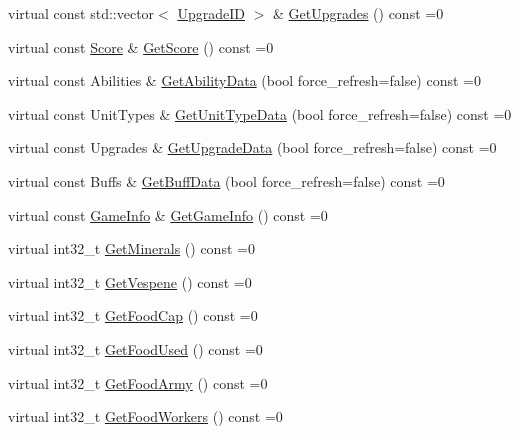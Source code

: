 \begin{DoxyCompactItemize}
\item 
virtual const std\+::vector$<$ \hyperlink{classsc2_1_1_s_c2_type}{Upgrade\+ID} $>$ \& \hyperlink{classsc2_1_1_observation_interface_a0a794661f0072921a75d4c5851cfb9e9}{Get\+Upgrades} () const =0
\item 
virtual const \hyperlink{structsc2_1_1_score}{Score} \& \hyperlink{classsc2_1_1_observation_interface_a3ced6a72078288c373ad04c72eb1fba7}{Get\+Score} () const =0
\item 
virtual const Abilities \& \hyperlink{classsc2_1_1_observation_interface_a99e1d892c350e4ae10c615bf3185eb85}{Get\+Ability\+Data} (bool force\+\_\+refresh=false) const =0
\item 
virtual const Unit\+Types \& \hyperlink{classsc2_1_1_observation_interface_ae80acee23f67a2b5f67fa511dd158aca}{Get\+Unit\+Type\+Data} (bool force\+\_\+refresh=false) const =0
\item 
virtual const Upgrades \& \hyperlink{classsc2_1_1_observation_interface_a10b0d3b3131951ad656cb091aaa2040d}{Get\+Upgrade\+Data} (bool force\+\_\+refresh=false) const =0
\item 
virtual const Buffs \& \hyperlink{classsc2_1_1_observation_interface_a1b891d52ce1fe82dac0288797ad3720a}{Get\+Buff\+Data} (bool force\+\_\+refresh=false) const =0
\item 
virtual const \hyperlink{structsc2_1_1_game_info}{Game\+Info} \& \hyperlink{classsc2_1_1_observation_interface_a7b73eb640b052409b0095609a8136102}{Get\+Game\+Info} () const =0
\item 
virtual int32\+\_\+t \hyperlink{classsc2_1_1_observation_interface_a107f76b56a961407bb772d91dfbbb040}{Get\+Minerals} () const =0
\item 
virtual int32\+\_\+t \hyperlink{classsc2_1_1_observation_interface_aa31de2f1b14a2306a282fef7314fbf37}{Get\+Vespene} () const =0
\item 
virtual int32\+\_\+t \hyperlink{classsc2_1_1_observation_interface_ac556f665e6920eb853711c1b7d4d54b3}{Get\+Food\+Cap} () const =0
\item 
virtual int32\+\_\+t \hyperlink{classsc2_1_1_observation_interface_a77f230bd98b95599338c7788aee00d26}{Get\+Food\+Used} () const =0
\item 
virtual int32\+\_\+t \hyperlink{classsc2_1_1_observation_interface_a7fd13a2a776f08f714d941ba9e4bafa8}{Get\+Food\+Army} () const =0
\item 
virtual int32\+\_\+t \hyperlink{classsc2_1_1_observation_interface_a19f0bdd8df647ee935dbe6f3c50d64e7}{Get\+Food\+Workers} () const =0
\item 

\end{DoxyCompactItemize}
